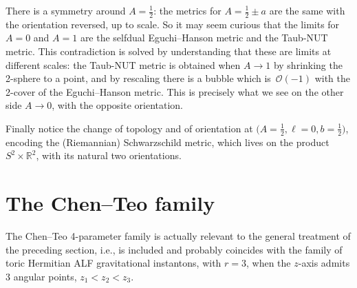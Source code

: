 \documentclass[10pt,a4paper]{amsart}
\numberwithin{equation}{section}
\begin{document}
 There is a symmetry around $A=\frac12$: the metrics for $A=\frac12\pm a$ are the same with the orientation reversed, up to scale. So it may seem curious that the limits for $A=0$ and $A=1$ are the selfdual Eguchi--Hanson metric and the Taub-NUT metric. This contradiction is solved by understanding that these are limits at different scales: the Taub-NUT metric is obtained when $A\rightarrow1$ by shrinking the 2-sphere to a point, and by rescaling there is a bubble which is~$\mathcal{O}(-1)$ with the 2-cover of the Eguchi--Hanson metric. This is precisely what we see on the other side $A\rightarrow0$, with the opposite orientation.

Finally notice the change of topology and of orientation at $\big(A = \frac{1}{2}, \ell = 0, b = \frac{1}{2}\big)$, encoding the (Riemannian) Schwarzschild metric, which lives on the product $S^2 \times \mathbb{R} ^2$, with its natural two orientations.






\section{The Chen--Teo family}







The Chen--Teo 4-parameter family is actually relevant to the general treatment of the preceding section, i.e., is included and probably coincides with the family of toric Hermitian ALF gravitational instantons, with $r = 3$, when the $z$-axis admits 3 angular points, $z_1 < z _2 < z _3$.
\end{document}
